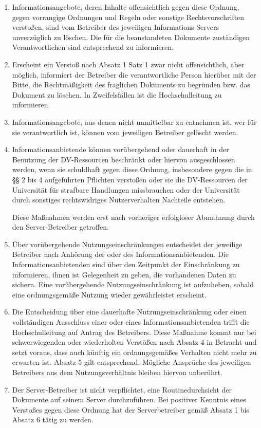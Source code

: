 \begin{enumerate}
\item Informationsangebote, deren Inhalte offensichtlich gegen diese Ordnung, gegen vorrangige Ordnungen und Regeln oder sonstige Rechtsvorschriften verstoßen, sind vom Betreiber des jeweiligen Informations-Servers unverzüglich zu löschen. Die für die beanstandeten Dokumente zuständigen Verantwortlichen sind entsprechend zu informieren.
\item Erscheint ein Verstoß nach Absatz 1 Satz 1 zwar nicht offensichtlich, aber möglich, informiert der Betreiber die verantwortliche Person hierüber mit der Bitte, die Rechtmäßigkeit des fraglichen Dokuments zu begründen bzw. das Dokument zu löschen. In Zweifelsfällen ist die Hochschulleitung zu informieren.
\item Informationsangebote, aus denen nicht unmittelbar zu entnehmen ist, wer für sie verantwortlich ist, können vom jeweiligen Betreiber gelöscht werden.
\item Informationsanbietende können vorübergehend oder dauerhaft in der Benutzung der DV-Ressourcen beschränkt oder hiervon ausgeschlossen werden, wenn 
sie schuldhaft gegen diese Ordnung, insbesondere gegen die in §§ 2 bis 4 aufgeführten Pflichten verstoßen oder 
sie die DV-Ressourcen der Universität für strafbare Handlungen missbrauchen oder 
der Universität durch sonstiges rechtswidriges Nutzerverhalten Nachteile entstehen. 

Diese Maßnahmen werden erst nach vorheriger erfolgloser Abmahnung
durch den Server-Betreiber getroffen.
\item Über vorübergehende Nutzungseinschränkungen entscheidet der jeweilige Betreiber nach Anhörung der oder des Informationsanbietenden. Die Informationsanbietenden sind über den Zeitpunkt der Einschränkung zu informieren, ihnen ist Gelegenheit zu geben, die vorhandenen Daten zu sichern. Eine vorübergehende Nutzungseinschränkung ist aufzuheben, sobald eine ordnungsgemäße Nutzung wieder gewährleistet erscheint.
\item Die Entscheidung über eine dauerhafte Nutzungseinschränkung oder einen vollständigen Ausschluss einer oder eines Informationsanbietenden trifft die Hochschulleitung auf Antrag des Betreibers. Diese Maßnahme kommt nur bei schwerwiegenden oder wiederholten Verstößen nach Absatz 4 in Betracht und setzt voraus, dass auch künftig ein ordnungsgemäßes Verhalten nicht mehr zu erwarten ist. Absatz 5 gilt entsprechend. Mögliche Ansprüche des jeweiligen Betreibers aus dem Nutzungsverhältnis bleiben hiervon unberührt.
\item Der Server-Betreiber ist nicht verpflichtet, eine Routinedurchsicht der Dokumente auf seinem Server durchzuführen. Bei positiver Kenntnis eines Verstoßes gegen diese Ordnung hat der Serverbetreiber gemäß Absatz 1 bis Absatz 6 tätig zu werden.
\end{enumerate}
